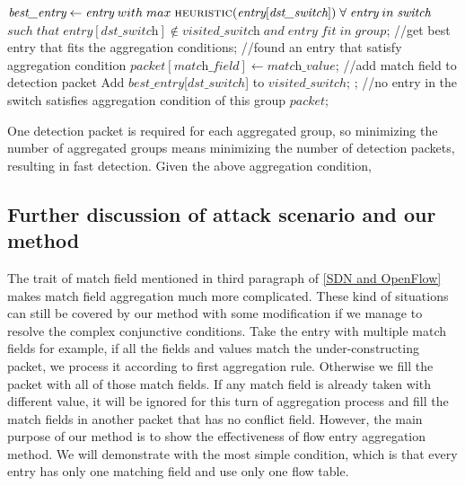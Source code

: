 \begin {tcolorbox}[blanker,float=tbp,
grow to left by=1cm, grow to right by=1cm]
\begin{algorithm}[H]
  \begin{algorithmic}[1]
      \State $\textit{best\_entry} \gets \textit{entry}\;with\;max\; \Call{heuristic}{\textit{entry}[\textit{dst\_switch}]}\;\forall\;\textit{entry}\;in\;\textit{switch}$
      \State $such\;that\;\textit{entry}[\textit{dst\_switch}] \notin \textit{visited\_switch}\;and\;\textit{entry}\;fit\;in\;group$;  //get best entry that fits the aggregation conditions;
        //found an entry that satisfy aggregation condition
        \State $\textit{packet}[\textit{match\_field}] \gets \textit{match\_value}$;  //add match field to detection packet
        \State Add $best\_entry$[$dst\_switch$] to $visited\_switch$;
        \State \Return {};  //no entry in the switch satisfies aggregation condition of this group
      \EndIf
      \State \Return $packet$;
    \EndFunction
  \end{algorithmic}
\end{algorithm}
\end{tcolorbox}

One detection packet is required for each aggregated group, so minimizing the number of aggregated groups means minimizing the number of detection packets, resulting in fast detection. Given the above aggregation condition,  



\subsection{Further discussion of attack scenario and our method}
\label{Further_discussion}

The trait of match field mentioned in third paragraph of \ref{SDN and OpenFlow} makes match field aggregation much more complicated. These kind of situations can still be covered by our method with some modification if we manage to resolve the complex conjunctive conditions. Take the entry with multiple match fields for example, if all the fields and values match the under-constructing packet, we process it according to first aggregation rule. Otherwise we fill the packet with all of those match fields. If any match field is already taken with different value, it will be ignored for this turn of aggregation process and fill the match fields in another packet that has no conflict field. However, the main purpose of our method is to show the effectiveness of flow entry aggregation method. We will demonstrate with the most simple condition, which is that every entry has only one matching field and use only one flow table.

